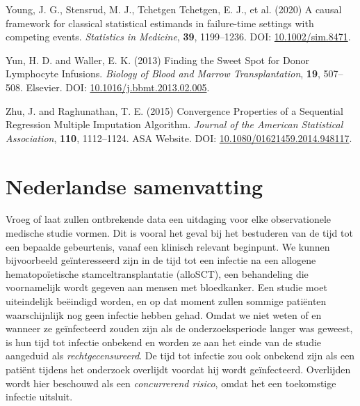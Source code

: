 \documentclass[
  letterpaper,
  paper=240mm:170mm,
  twoside=true,
  open=right,
  fontsize=10pt,
  pagesize=false,
  BCOR=15mm,
  DIV=14,
  headinclude=true,
  footinclude=false,
  headsepline=on]{scrbook}
\newlength{\cslhangindent}
\newenvironment{CSLReferences}[2] %
 {\begin{list}{}{%
  \setlength{\itemindent}{0pt}
  \setlength{\leftmargin}{0pt}
  \setlength{\parsep}{0pt}
  \ifodd #1
   \setlength{\leftmargin}{\cslhangindent}
   \setlength{\itemindent}{-1\cslhangindent}
  \fi
  \setlength{\itemsep}{#2\baselineskip}}}
 {\end{list}}
\begin{document}
\begin{CSLReferences}{1}{1}
Young, J. G., Stensrud, M. J., Tchetgen Tchetgen, E. J., et al. (2020) A
causal framework for classical statistical estimands in failure-time
settings with competing events. \emph{Statistics in Medicine},
\textbf{39}, 1199--1236. DOI:
\href{https://doi.org/10.1002/sim.8471}{10.1002/sim.8471}.

Yun, H. D. and Waller, E. K. (2013) Finding the {Sweet Spot} for {Donor
Lymphocyte Infusions}. \emph{Biology of Blood and Marrow
Transplantation}, \textbf{19}, 507--508. Elsevier. DOI:
\href{https://doi.org/10.1016/j.bbmt.2013.02.005}{10.1016/j.bbmt.2013.02.005}.

Zhu, J. and Raghunathan, T. E. (2015) Convergence {Properties} of a
{Sequential Regression Multiple Imputation Algorithm}. \emph{Journal of
the American Statistical Association}, \textbf{110}, 1112--1124. ASA
Website. DOI:
\href{https://doi.org/10.1080/01621459.2014.948117}{10.1080/01621459.2014.948117}.

\end{CSLReferences}


\chapter*{Nederlandse samenvatting}\label{nederlandse-samenvatting}


Vroeg of laat zullen ontbrekende data een uitdaging voor elke
observationele medische studie vormen. Dit is vooral het geval bij het
bestuderen van de tijd tot een bepaalde gebeurtenis, vanaf een klinisch
relevant beginpunt. We kunnen bijvoorbeeld geïnteresseerd zijn in de
tijd tot een infectie na een allogene hematopoïetische
stamceltransplantatie (alloSCT), een behandeling die voornamelijk wordt
gegeven aan mensen met bloedkanker. Een studie moet uiteindelijk
beëindigd worden, en op dat moment zullen sommige patiënten
waarschijnlijk nog geen infectie hebben gehad. Omdat we niet weten of en
wanneer ze geïnfecteerd zouden zijn als de onderzoeksperiode langer was
geweest, is hun tijd tot infectie onbekend en worden ze aan het einde
van de studie aangeduid als \emph{rechtgecensureerd}. De tijd tot
infectie zou ook onbekend zijn als een patiënt tijdens het onderzoek
overlijdt voordat hij wordt geïnfecteerd. Overlijden wordt hier
beschouwd als een \emph{concurrerend risico}, omdat het een toekomstige
infectie uitsluit.
\end{document}
